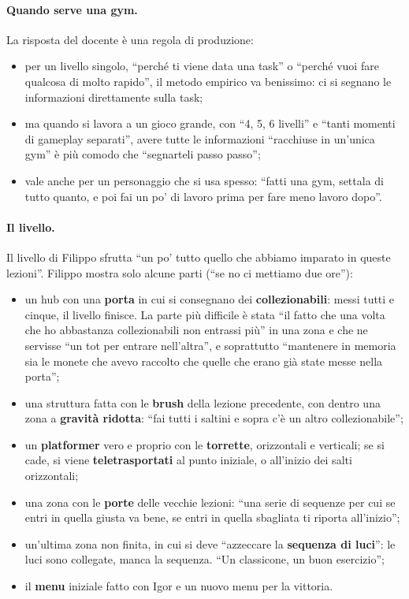 \paragraph{Quando serve una gym.} La risposta del docente è una regola di produzione:
\begin{itemize}
  \item per un livello singolo, ``perché ti viene data una task'' o ``perché vuoi fare
        qualcosa di molto rapido'', il metodo empirico va benissimo: ci si segnano le
        informazioni direttamente sulla task;
  \item ma quando si lavora a un gioco grande, con ``4, 5, 6 livelli'' e ``tanti momenti di
        gameplay separati'', avere tutte le informazioni ``racchiuse in un'unica gym'' è più
        comodo che ``segnarteli passo passo'';
  \item vale anche per un personaggio che si usa spesso: ``fatti una gym, settala di tutto
        quanto, e poi fai un po' di lavoro prima per fare meno lavoro dopo''.
\end{itemize}

\paragraph{Il livello.} Il livello di Filippo sfrutta ``un po' tutto quello che abbiamo
imparato in queste lezioni''. Filippo mostra solo alcune parti (``se no ci mettiamo due
ore''):
\begin{itemize}
  \item un hub con una \textbf{porta} in cui si consegnano dei \textbf{collezionabili}:
        messi tutti e cinque, il livello finisce. La parte più difficile è stata ``il fatto
        che una volta che ho abbastanza collezionabili non entrassi più'' in una zona e che
        ne servisse ``un tot per entrare nell'altra'', e soprattutto ``mantenere in memoria
        sia le monete che avevo raccolto che quelle che erano già state messe nella porta'';
  \item una struttura fatta con le \textbf{brush} della lezione precedente, con dentro una
        zona a \textbf{gravità ridotta}: ``fai tutti i saltini e sopra c'è un altro
        collezionabile'';
  \item un \textbf{platformer} vero e proprio con le \textbf{torrette}, orizzontali e
        verticali; se si cade, si viene \textbf{teletrasportati} al punto iniziale, o
        all'inizio dei salti orizzontali;
  \item una zona con le \textbf{porte} delle vecchie lezioni: ``una serie di sequenze per
        cui se entri in quella giusta va bene, se entri in quella sbagliata ti riporta
        all'inizio'';
  \item un'ultima zona non finita, in cui si deve ``azzeccare la \textbf{sequenza di luci}'':
        le luci sono collegate, manca la sequenza. ``Un classicone, un buon esercizio'';
  \item il \textbf{menu} iniziale fatto con Igor e un nuovo menu per la vittoria.
\end{itemize}


